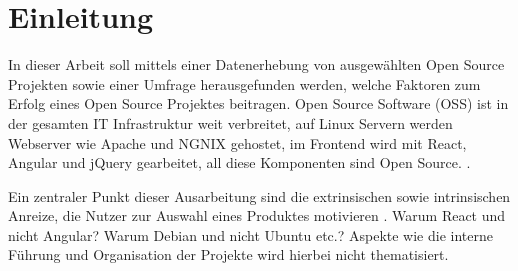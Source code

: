 \chapter{Einleitung}






In dieser Arbeit soll mittels einer Datenerhebung von ausgewählten Open Source Projekten sowie einer
Umfrage herausgefunden werden, welche Faktoren zum Erfolg eines Open Source Projektes beitragen. 
Open Source Software (OSS) ist in der gesamten IT Infrastruktur weit verbreitet, auf Linux Servern
werden Webserver wie Apache und NGNIX gehostet, im Frontend wird mit React, Angular und jQuery 
gearbeitet, all diese Komponenten sind Open Source.
\cite{W3Techs_WebServer, StackOverflowSurvey2021}. 

Ein zentraler Punkt dieser Ausarbeitung sind die extrinsischen sowie intrinsischen Anreize,
die Nutzer zur Auswahl eines Produktes motivieren \cite{midhaFactorsAffectingSuccess2012}. %
Warum React und nicht Angular? Warum Debian und nicht Ubuntu etc.? 
Aspekte wie die interne Führung und Organisation der Projekte wird hierbei nicht thematisiert.


